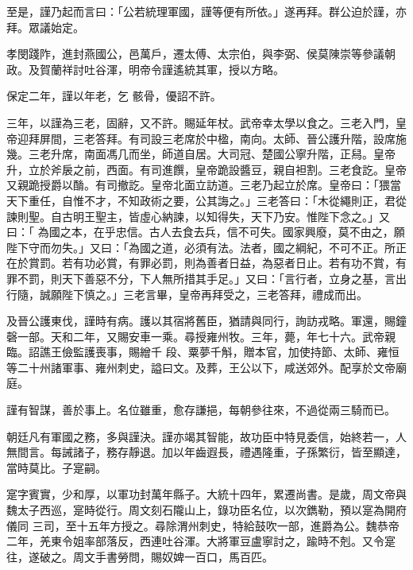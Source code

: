 \begin{pinyinscope}
 至是，謹乃起而言曰：「公若統理軍國，謹等便有所依。」遂再拜。群公迫於謹，亦拜。眾議始定。



 孝閔踐阼，進封燕國公，邑萬戶，遷太傅、太宗伯，與李弼、侯莫陳崇等參議朝政。及賀蘭祥討吐谷渾，明帝令謹遙統其軍，授以方略。



 保定二年，謹以年老，乞
 骸骨，優詔不許。



 三年，以謹為三老，固辭，又不許。賜延年杖。武帝幸太學以食之。三老入門，皇帝迎拜屏間，三老答拜。有司設三老席於中楹，南向。太師、晉公護升階，設席施幾。三老升席，南面馮几而坐，師道自居。大司冠、楚國公寧升階，正舄。皇帝升，立於斧扆之前，西面。有司進饌，皇帝跪設醬豆，親自袒割。三老食訖。皇帝又親跪授爵以酳。有司撤訖。皇帝北面立訪道。三老乃起立於席。皇帝曰：「猥當天下重任，自惟不才，不知政術之要，公其誨之。」三老答曰：「木從繩則正，君從諫則聖。自古明王聖主，皆虛心納諫，以知得失，天下乃安。惟陛下念之。」又曰：「
 為國之本，在乎忠信。古人去食去兵，信不可失。國家興廢，莫不由之，願陛下守而勿失。」又曰：「為國之道，必須有法。法者，國之綱紀，不可不正。所正在於賞罰。若有功必賞，有罪必罰，則為善者日益，為惡者日止。若有功不賞，有罪不罰，則天下善惡不分，下人無所措其手足。」又曰：「言行者，立身之基，言出行隨，誠願陛下慎之。」三老言畢，皇帝再拜受之，三老答拜，禮成而出。



 及晉公護東伐，謹時有病。護以其宿將舊臣，猶請與同行，詢訪戎略。軍還，賜鐘磬一部。天和二年，又賜安車一乘。尋授雍州牧。三年，薨，年七十六。武帝親臨。詔譙王儉監護喪事，賜繒千
 段、粟夢千斛，贈本官，加使持節、太師、雍恒等二十州諸軍事、雍州刺史，謚曰文。及葬，王公以下，咸送郊外。配享於文帝廟庭。



 謹有智謀，善於事上。名位雖重，愈存謙挹，每朝參往來，不過從兩三騎而已。



 朝廷凡有軍國之務，多與謹決。謹亦竭其智能，故功臣中特見委信，始終若一，人無間言。每誡諸子，務存靜退。加以年齒遐長，禮遇隆重，子孫繁衍，皆至顯達，當時莫比。子寔嗣。



 寔字賓實，少和厚，以軍功封萬年縣子。大統十四年，累遷尚書。是歲，周文帝與魏太子西巡，寔時從行。周文刻石隴山上，錄功臣名位，以次鐫勒，預以寔為開府儀同
 三司，至十五年方授之。尋除渭州刺史，特給鼓吹一部，進爵為公。魏恭帝二年，羌東令姐率部落反，西連吐谷渾。大將軍豆盧寧討之，踰時不剋。又令寔往，遂破之。周文手書勞問，賜奴婢一百口，馬百匹。




\end{pinyinscope}
